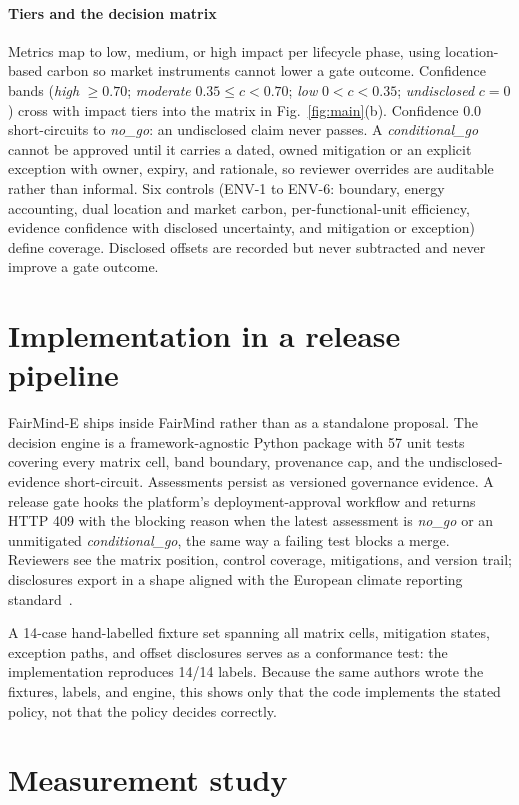 \documentclass[10pt,conference]{IEEEtran}
\newcommand{\sysname}{FairMind-E}
\begin{document}
\paragraph{Tiers and the decision matrix} Metrics map to low, medium, or high
impact per lifecycle phase, using location-based carbon so market instruments
cannot lower a gate outcome. Confidence bands (\emph{high} $\geq 0.70$;
\emph{moderate} $0.35 \leq c < 0.70$; \emph{low} $0 < c < 0.35$;
\emph{undisclosed} $c = 0$) cross with impact tiers into the matrix in
Fig.~\ref{fig:main}(b). Confidence 0.0 short-circuits to \emph{no\_go}: an
undisclosed claim never passes. A \emph{conditional\_go} cannot be approved
until it carries a dated, owned mitigation or an explicit exception with owner,
expiry, and rationale, so reviewer overrides are auditable rather than
informal. Six controls (ENV-1 to ENV-6: boundary, energy accounting, dual
location and market carbon, per-functional-unit efficiency, evidence confidence
with disclosed uncertainty, and mitigation or exception) define coverage.
Disclosed offsets are recorded but never subtracted and never improve a gate
outcome.

\section{Implementation in a release pipeline}

\sysname{} ships inside FairMind rather than as a standalone proposal. The
decision engine is a framework-agnostic Python package with 57 unit tests
covering every matrix cell, band boundary, provenance cap, and the
undisclosed-evidence short-circuit. Assessments persist as versioned governance
evidence. A release gate hooks the platform's deployment-approval workflow and
returns HTTP 409 with the blocking reason when the latest assessment is
\emph{no\_go} or an unmitigated \emph{conditional\_go}, the same way a failing
test blocks a merge. Reviewers see the matrix position, control coverage,
mitigations, and version trail; disclosures export in a shape aligned with the
European climate reporting standard~\cite{csrd}.

A 14-case hand-labelled fixture set spanning all matrix cells, mitigation
states, exception paths, and offset disclosures serves as a conformance test:
the implementation reproduces 14/14 labels. Because the same authors wrote the
fixtures, labels, and engine, this shows only that the code implements the
stated policy, not that the policy decides correctly.

\section{Measurement study}
\end{document}
